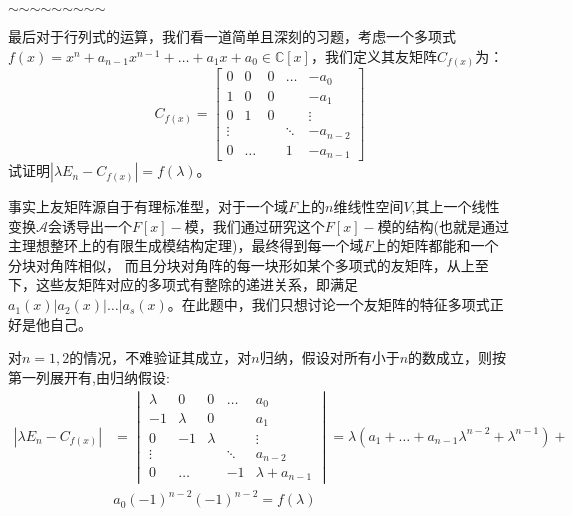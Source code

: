 \documentclass[a4paper,12pt]{ctexart}
\newenvironment{prooff}{{\noindent\it\textcolor{cyan!40!black}{Proof}:}\quad}{\par}
\begin{document}
\noindent\hfil$\sim$\hfil$\sim$\hfil$\sim$\hfil$\sim$\hfil$\sim$\hfil$\sim$\hfil$\sim$\hfil$\sim$\hfil$\sim$\hfil

最后对于行列式的运算，我们看一道简单且深刻的习题，考虑一个多项式$f(x)=x^n+a_{n-1}x^{n-1}+\dots+a_1x+a_0\in \mathbb{C}[x]$，我们定义其友矩阵$C_{f(x)}$为：
\begin{equation*}
    C_{f(x)}=\begin{bmatrix}
        0      & 0     & 0 & \dots  & -a_0     \\
        1      & 0     & 0 &        & -a_1     \\
        0      & 1     & 0 &        & \vdots   \\
        \vdots &       &   & \ddots & -a_{n-2} \\
        0      & \dots &   & 1      & -a_{n-1}
    \end{bmatrix}
\end{equation*}
试证明$|\lambda E_n- C_{f(x)}|=f(\lambda)$。

事实上友矩阵源自于有理标准型，对于一个域$F$上的$n$维线性空间$V$,其上一个线性变换$\mathcal{A}$会诱导出一个$F[x]-$模，我们通过研究这个$F[x]-$模的结构(也就是通过主理想整环上的有限生成模结构定理)，最终得到每一个域$F$上的矩阵都能和一个分块对角阵相似，
而且分块对角阵的每一块形如某个多项式的友矩阵，从上至下，这些友矩阵对应的多项式有整除的递进关系，即满足$a_1(x)|a_2(x)|\dots|a_s(x)$。在此题中，我们只想讨论一个友矩阵的特征多项式正好是他自己。

\begin{prooff}
    对$n=1,2$的情况，不难验证其成立，对$n$归纳，假设对所有小于$n$的数成立，则按第一列展开有,由归纳假设:
    \begin{align*}
        |\lambda E_n- C_{f(x)}| & =\begin{vmatrix}
            \lambda & 0       & 0       & \dots  & a_0             \\
            -1      & \lambda & 0       &        & a_1             \\
            0       & -1      & \lambda &        & \vdots          \\
            \vdots  &         &         & \ddots & a_{n-2}         \\
            0       & \dots   &         & -1     & \lambda+a_{n-1}
        \end{vmatrix}=\lambda(a_1+\dots+a_{n-1}\lambda^{n-2}+\lambda^{n-1})+ \\
                                & a_0(-1)^{n-2}(-1)^{n-2}=f(\lambda)
    \end{align*}
\end{prooff}
\end{document}
